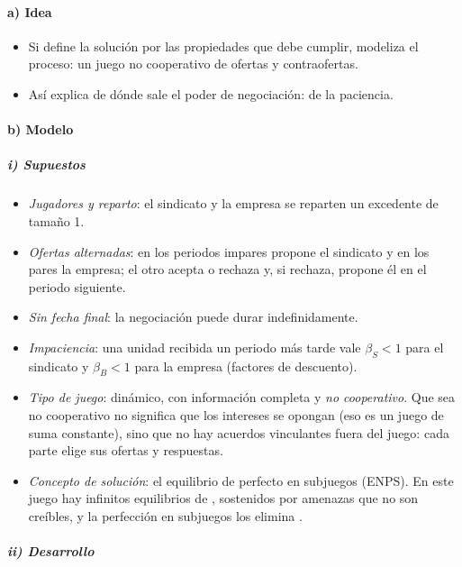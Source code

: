 \documentclass[11pt]{article}
\begin{document}
\paragraph{a) Idea}

\begin{itemize}
\item Si  define la solución por las propiedades que debe cumplir, \textcite{Rubinstein1982Perfect} modeliza el proceso: un juego no cooperativo de ofertas y contraofertas.
\item Así explica de dónde sale el poder de negociación: de la paciencia.
\end{itemize}

\paragraph{b) Modelo}

\subparagraph{i) Supuestos}

\begin{itemize}
\item \emph{Jugadores y reparto}: el sindicato y la empresa se reparten un excedente de tamaño 1.
\item \emph{Ofertas alternadas}: en los periodos impares propone el sindicato y en los pares la empresa; el otro acepta o rechaza y, si rechaza, propone él en el periodo siguiente.
\item \emph{Sin fecha final}: la negociación puede durar indefinidamente.
\item \emph{Impaciencia}: una unidad recibida un periodo más tarde vale $\beta_S<1$ para el sindicato y $\beta_B<1$ para la empresa (factores de descuento).
\item \emph{Tipo de juego}: dinámico, con información completa y \emph{no cooperativo}. Que sea no cooperativo no significa que los intereses se opongan (eso es un juego de suma constante), sino que no hay acuerdos vinculantes fuera del juego: cada parte elige sus ofertas y respuestas.
\item \emph{Concepto de solución}: el equilibrio de  perfecto en subjuegos (ENPS). En este juego hay infinitos equilibrios de , sostenidos por amenazas que no son creíbles, y la perfección en subjuegos los elimina .
\end{itemize}

\subparagraph{ii) Desarrollo}
\end{document}
